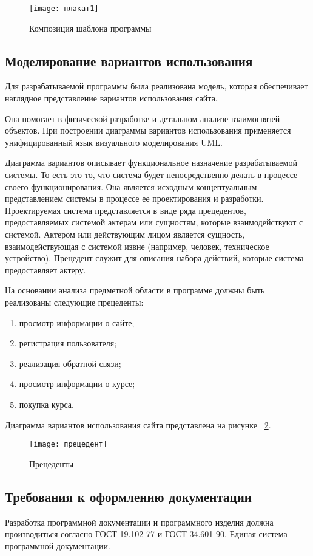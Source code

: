 \begin{figure}[ht]
	\texttt{[image: плакат1]}
	\caption{Композиция шаблона программы}
	\label{плакат1:image}
\end{figure}

\subsection{Моделирование вариантов использования}

Для разрабатываемой программы была реализована модель, которая обеспечивает наглядное представление вариантов использования сайта.

Она помогает в физической разработке и детальном анализе взаимосвязей объектов. При построении диаграммы вариантов использования применяется унифицированный язык визуального моделирования UML.

Диаграмма вариантов описывает функциональное назначение разрабатываемой системы. То есть это то, что система будет непосредственно делать в процессе своего функционирования. Она является исходным концептуальным представлением системы в процессе ее проектирования и разработки. Проектируемая система представляется в виде ряда прецедентов, предоставляемых системой актерам или сущностям, которые взаимодействуют с системой. Актером или действующим лицом является сущность, взаимодействующая с системой извне (например, человек, техническое устройство). Прецедент служит для описания набора действий, которые система предоставляет актеру.

На основании анализа предметной области в программе должны быть реализованы следующие прецеденты:
\begin{enumerate}
	\item просмотр информации о сайте;
	\item регистрация пользователя;
	\item реализация обратной связи;
	\item просмотр информации о курсе;
	\item покупка курса.
\end{enumerate}

Диаграмма вариантов использования сайта представлена на рисунке ~\ref{прецедент:image}.

\begin{figure}[ht]
	\texttt{[image: прецедент]}
	\caption{Прецеденты}
	\label{прецедент:image}
\end{figure}

\subsection{Требования к оформлению документации}

Разработка программной документации и программного изделия должна производиться согласно ГОСТ 19.102-77 и ГОСТ 34.601-90. Единая система программной документации.
